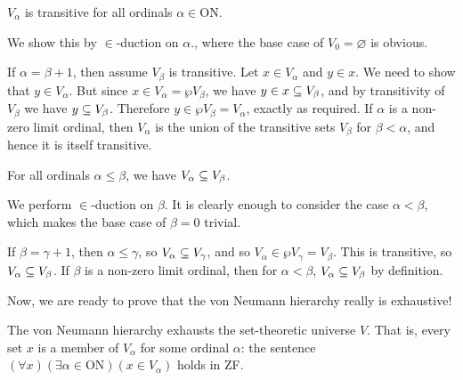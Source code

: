\documentclass{article}
\begin{document}
\begin{proposition}
    $V_\alpha$ is transitive for all ordinals $\alpha \in \mathrm{ON}$.
\end{proposition}

\begin{prf}
    We show this by $\in$-duction on $\alpha$., where the base case of $V_0 = \varnothing$ is obvious.
    
    If $\alpha = \beta + 1$, then assume $V_\beta$ is transitive. Let $x \in V_\alpha$ and $y \in x$. We need to show that $y \in V_\alpha$. But since $x \in V_\alpha = \wp V_\beta$, we have $y \in x \subseteq V_\beta$, and by transitivity of $V_\beta$ we have $y \subseteq V_\beta$. Therefore $y \in \wp V_\beta = V_\alpha$, exactly as required.
    If $\alpha$ is a non-zero limit ordinal, then $V_\alpha$ is the union of the transitive sets $V_\beta$ for $\beta < \alpha$, and hence it is itself transitive.
\end{prf}

\begin{proposition}
    For all ordinals $\alpha \leq \beta$, we have $V_\alpha \subseteq V_\beta$.
\end{proposition}

\begin{prf}
    We perform $\in$-duction on $\beta$. It is clearly enough to consider the case $\alpha < \beta$, which makes the base case of $\beta = 0$ trivial.
    
    If $\beta = \gamma + 1$, then $\alpha \leq \gamma$, so $V_\alpha \subseteq V_\gamma$, and so $V_\alpha \in \wp V_\gamma = V_\beta$. This is transitive, so $V_\alpha \subseteq V_\beta$.
    If $\beta$ is a non-zero limit ordinal, then for $\alpha < \beta$, $V_\alpha \subseteq V_\beta$ by definition.
\end{prf}

Now, we are ready to prove that the von Neumann hierarchy really is exhaustive!

\begin{theorem}
    The von Neumann hierarchy exhausts the set-theoretic universe $V$. That is, every set $x$ is a member of $V_\alpha$ for some ordinal $\alpha$: the sentence $(\forall x)(\exists \alpha \in \mathrm{ON})(x \in V_\alpha)$ holds in ZF.
\end{theorem}
\end{document}
